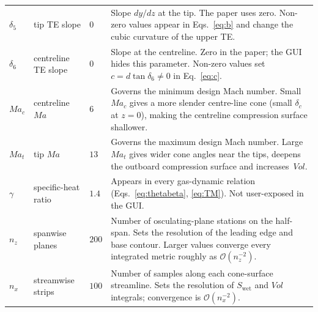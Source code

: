 \documentclass[11pt,a4paper]{article}
\newcommand{\Ma}{\mathit{Ma}}
\newcommand{\Vol}{\mathit{Vol}}
\newcommand{\Swet}{S_{\mathrm{wet}}}
\newcommand{\dc}{\delta_{c}}
\begin{document}
\begin{table}[h]
\begin{tabular}{@{}lllp{}@{}}
$\delta_{5}$   & tip TE slope          & $0$            &
Slope $dy/dz$ at the tip. The paper uses zero. Non-zero values appear
in Eqs.~\ref{eq:b} and change the cubic curvature of the upper TE. \\

$\delta_{6}$   & centreline TE slope   & $0$            &
Slope at the centreline. Zero in the paper; the GUI hides this
parameter. Non-zero values set $c=d\tan\delta_{6}\ne 0$ in
Eq.~\ref{eq:c}. \\

$\Ma_{c}$      & centreline $\Ma$      & $6$            &
Governs the minimum design Mach number. Small $\Ma_{c}$ gives a more
slender centre-line cone (small $\dc$ at $z=0$), making the centreline
compression surface shallower. \\

$\Ma_{t}$      & tip $\Ma$             & $13$           &
Governs the maximum design Mach number. Large $\Ma_{t}$ gives wider
cone angles near the tips, deepens the outboard compression surface
and increases~$\Vol$. \\

$\gamma$       & specific-heat ratio   & $1.4$          &
Appears in every gas-dynamic relation (Eqs.~\ref{eq:thetabeta},
\ref{eq:TM}). Not user-exposed in the GUI. \\

$n_{z}$        & spanwise planes       & $200$          &
Number of osculating-plane stations on the half-span. Sets the
resolution of the leading edge and base contour. Larger values
converge every integrated metric roughly as $\mathcal{O}(n_{z}^{-2})$. \\

$n_{x}$        & streamwise strips     & $100$          &
Number of samples along each cone-surface streamline. Sets the
resolution of $\Swet$ and $\Vol$ integrals; convergence is
$\mathcal{O}(n_{x}^{-2})$. \\
\bottomrule
\end{tabular}
\end{table}
\end{document}
